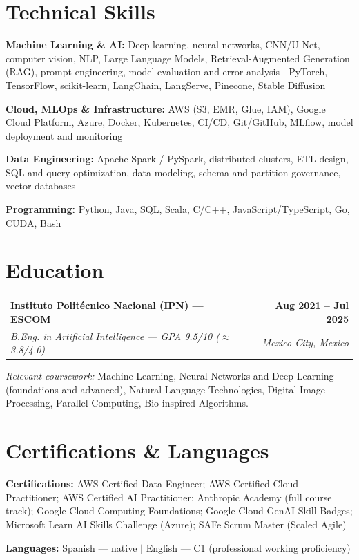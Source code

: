 \documentclass[letterpaper,10pt]{article}
\makeatletter
\newcommand{\role}[4]{%
  \vspace{2pt}%
  \begin{tabularx}{\textwidth}{@{}X r@{}}
    \textbf{#1} & \textbf{#2} \\
    \textit{#3} & \textit{#4} \\
  \end{tabularx}%
  \vspace{-2pt}%
}
\newcommand{\skillrow}[2]{\textbf{#1:} #2\par\vspace{2pt}}
\makeatother
\begin{document}
\section{Technical Skills}
\skillrow{Machine Learning \& AI}{Deep learning, neural networks, CNN/U-Net, computer
vision, NLP, Large Language Models, Retrieval-Augmented Generation (RAG), prompt
engineering, model evaluation and error analysis $|$ PyTorch, TensorFlow, scikit-learn,
LangChain, LangServe, Pinecone, Stable Diffusion}

\skillrow{Cloud, MLOps \& Infrastructure}{AWS (S3, EMR, Glue, IAM), Google Cloud Platform,
Azure, Docker, Kubernetes, CI/CD, Git/GitHub, MLflow, model deployment and monitoring}

\skillrow{Data Engineering}{Apache Spark / PySpark, distributed clusters, ETL design, SQL
and query optimization, data modeling, schema and partition governance, vector databases}

\skillrow{Programming}{Python, Java, SQL, Scala, C/C++, JavaScript/TypeScript, Go, CUDA, Bash}

\section{Education}
\role{Instituto Politécnico Nacional (IPN) --- ESCOM}{Aug 2021 -- Jul 2025}
     {B.Eng. in Artificial Intelligence --- GPA 9.5/10 ($\approx$3.8/4.0)}{Mexico City, Mexico}
\vspace{5pt}

\textit{Relevant coursework:} Machine Learning, Neural Networks and Deep Learning
(foundations and advanced), Natural Language Technologies, Digital Image Processing,
Parallel Computing, Bio-inspired Algorithms.

\section{Certifications \& Languages}
\skillrow{Certifications}{AWS Certified Data Engineer; AWS Certified Cloud Practitioner;
AWS Certified AI Practitioner; Anthropic Academy (full course track); Google Cloud
Computing Foundations; Google Cloud GenAI Skill Badges; Microsoft Learn AI Skills
Challenge (Azure); SAFe Scrum Master (Scaled Agile)}

\skillrow{Languages}{Spanish --- native $|$ English --- C1 (professional working proficiency)}
\end{document}
